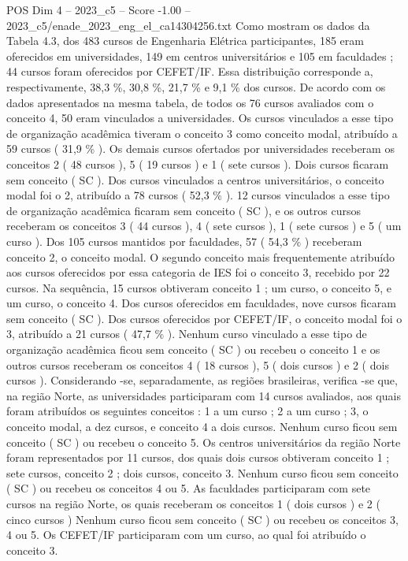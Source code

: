 \begin{textsample}{POS Dim 4 – 2023\_c5 – Score -1.00 – 2023\_c5/enade\_2023\_eng\_el\_ca14304256.txt}
Como mostram os dados da Tabela 4.3, dos 483 cursos de Engenharia Elétrica participantes, 185 eram oferecidos em universidades, 149 em centros universitários e 105 em faculdades ; 44 cursos foram oferecidos por CEFET/IF.
Essa distribuição corresponde a, respectivamente, 38,3 \%, 30,8 \%, 21,7 \% e 9,1 \% dos cursos.
De acordo com os dados apresentados na mesma tabela, de todos os 76 cursos avaliados com o conceito 4, 50 eram vinculados a universidades.
Os cursos vinculados a esse tipo de organização acadêmica tiveram o conceito 3 como conceito modal, atribuído a 59 cursos ( 31,9 \% ).
Os demais cursos ofertados por universidades receberam os conceitos 2 ( 48 cursos ), 5 ( 19 cursos ) e 1 ( sete cursos ).
Dois cursos ficaram sem conceito ( SC ).
Dos cursos vinculados a centros universitários, o conceito modal foi o 2, atribuído a 78 cursos ( 52,3 \% ). 12 cursos vinculados a esse tipo de organização acadêmica ficaram sem conceito ( SC ), e os outros cursos receberam os conceitos 3 ( 44 cursos ), 4 ( sete cursos ), 1 ( sete cursos ) e 5 ( um curso ).
Dos 105 cursos mantidos por faculdades, 57 ( 54,3 \% ) receberam conceito 2, o conceito modal.
O segundo conceito mais frequentemente atribuído aos cursos oferecidos por essa categoria de IES foi o conceito 3, recebido por 22 cursos.
Na sequência, 15 cursos obtiveram conceito 1 ; um curso, o conceito 5, e um curso, o conceito 4.
Dos cursos oferecidos em faculdades, nove cursos ficaram sem conceito ( SC ).
Dos cursos oferecidos por CEFET/IF, o conceito modal foi o 3, atribuído a 21 cursos ( 47,7 \% ).
Nenhum curso vinculado a esse tipo de organização acadêmica ficou sem conceito ( SC ) ou recebeu o conceito 1 e os outros cursos receberam os conceitos 4 ( 18 cursos ), 5 ( dois cursos ) e 2 ( dois cursos ).
Considerando -se, separadamente, as regiões brasileiras, verifica -se que, na região Norte, as universidades participaram com 14 cursos avaliados, aos quais foram atribuídos os seguintes conceitos : 1 a um curso ; 2 a um curso ; 3, o conceito modal, a dez cursos, e conceito 4 a dois cursos.
Nenhum curso ficou sem conceito ( SC ) ou recebeu o conceito 5.
Os centros universitários da região Norte foram representados por 11 cursos, dos quais dois cursos obtiveram conceito 1 ; sete cursos, conceito 2 ; dois cursos, conceito 3.
Nenhum curso ficou sem conceito ( SC ) ou recebeu os conceitos 4 ou 5.
As faculdades participaram com sete cursos na região Norte, os quais receberam os conceitos 1 ( dois cursos ) e 2 ( cinco cursos ) Nenhum curso ficou sem conceito ( SC ) ou recebeu os conceitos 3, 4 ou 5.
Os CEFET/IF participaram com um curso, ao qual foi atribuído o conceito 3.

\end{textsample}
